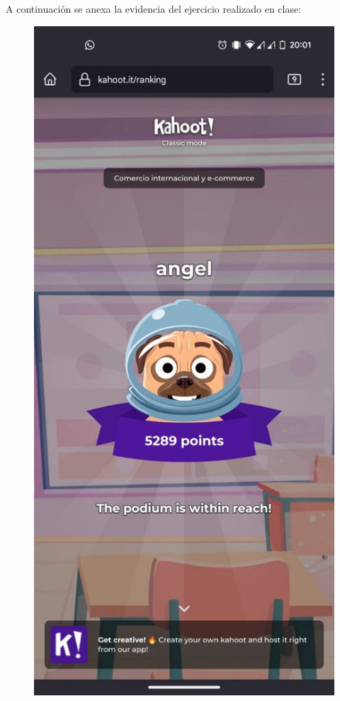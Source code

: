 \documentclass[a4paper,12pt]{article}
\begin{document}
A continuación se anexa la evidencia del ejercicio realizado en clase:
\vspace{1cm}
\begin{figure}[h!]
\centering
	\includegraphics[width=.5\textwidth]{fig1}
\end{figure}
\end{document}
